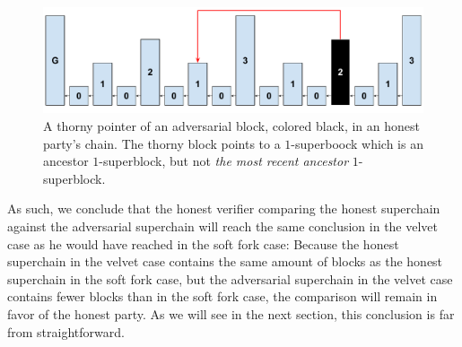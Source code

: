 \begin{figure}[h]
	\begin{center}
		\includegraphics[width=0.9\columnwidth]{figures/simple_thorny.pdf}
	\end{center}
    \caption{A thorny pointer of an adversarial block, colored black, in an honest party's chain. The thorny block points to a $1$-superboock which is an ancestor
		$1$-superblock, but not \emph{the most recent ancestor} $1$-superblock.}
	\label{fig:skip_ancestor}
\end{figure}

As such, we conclude that the honest verifier comparing the honest superchain
against the adversarial superchain will reach the same conclusion in the velvet
case as he would have reached in the soft fork case: Because the honest
superchain in the velvet case contains the same amount of blocks as the honest
superchain in the soft fork case, but the adversarial superchain in the velvet
case contains fewer blocks than in the soft fork case, the comparison will
remain in favor of the honest party. As we will see in the next section, this
conclusion is far from straightforward.
